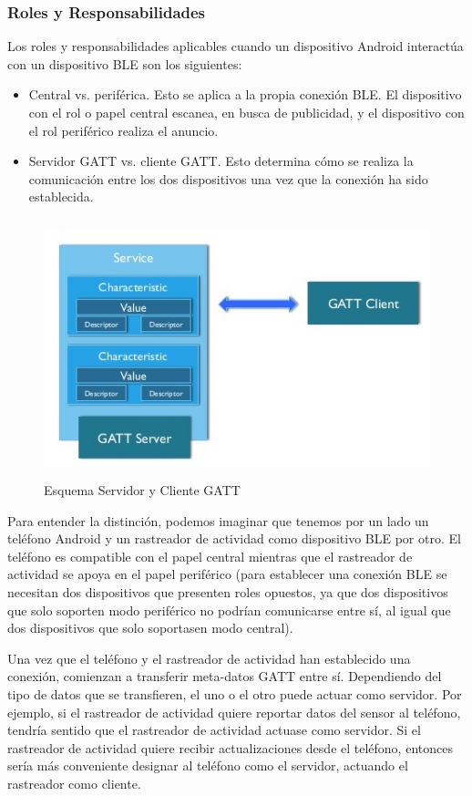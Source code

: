 \subsubsection{Roles y Responsabilidades}
Los roles y responsabilidades aplicables cuando un dispositivo Android interactúa con un dispositivo BLE son los siguientes:
\begin{itemize}
\item Central vs. periférica. Esto se aplica a la propia conexión BLE. El dispositivo con el rol o papel central escanea, en busca de publicidad, y el dispositivo con el rol periférico realiza el anuncio.
\item Servidor GATT vs. cliente GATT. Esto determina cómo se realiza la comunicación entre los dos dispositivos una vez que la conexión ha sido establecida.
\end{itemize}

\begin{figure}[h] \centering
 \includegraphics[height=7.5cm,keepaspectratio]{graphs/gattServerClient.png} \caption{Esquema Servidor y Cliente GATT \cite{androiddevguide}}\label{fig:gattconexion}
\end{figure}

Para entender la distinción, podemos imaginar que tenemos por un lado un teléfono Android y un rastreador de actividad como dispositivo BLE por otro. El teléfono es compatible con el papel central mientras que el rastreador de actividad se apoya en el papel periférico (para establecer una conexión BLE se necesitan dos dispositivos que presenten roles opuestos, ya que dos dispositivos que solo soporten modo periférico no podrían comunicarse entre sí, al igual que dos dispositivos que solo soportasen modo central).

Una vez que el teléfono y el rastreador de actividad han establecido una conexión, comienzan a transferir meta-datos GATT entre sí. Dependiendo del tipo de datos que se transfieren, el uno o el otro puede actuar como servidor. Por ejemplo, si el rastreador de actividad quiere reportar datos del sensor al teléfono, tendría sentido que el rastreador de actividad actuase como servidor. Si el rastreador de actividad quiere recibir actualizaciones desde el teléfono, entonces sería más conveniente designar al teléfono como el servidor, actuando el rastreador como cliente.

